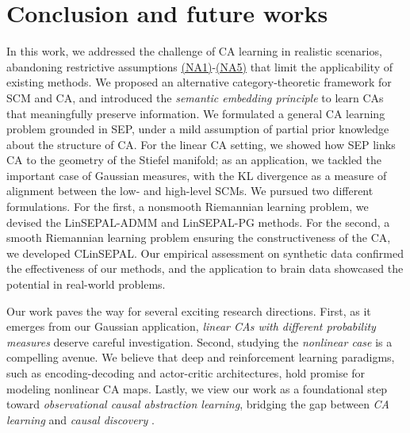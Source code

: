 \section{Conclusion and future works}\label{sec:concl_and_fw}
In this work, we addressed the challenge of CA learning in realistic scenarios, abandoning restrictive assumptions \hyperlink{(NA1)}{(NA1)}-\hyperlink{(NA5)}{(NA5)} that limit the applicability of existing methods. We proposed an alternative category-theoretic framework for SCM and CA, and introduced the \emph{semantic embedding principle} to learn CAs that meaningfully preserve information. We formulated a general CA learning problem grounded in SEP, under a mild assumption of partial prior knowledge about the structure of CA. 
For the linear CA setting, we showed how SEP links CA to the geometry of the Stiefel manifold; as an application, we tackled the important case of Gaussian measures, with the KL divergence as a measure of alignment between the low- and high-level SCMs. We pursued two different formulations.
For the first, a nonsmooth Riemannian learning problem, we devised the LinSEPAL-ADMM and LinSEPAL-PG methods. 
For the second, a smooth Riemannian learning problem ensuring the constructiveness of the CA, we developed CLinSEPAL.
Our empirical assessment on synthetic data confirmed the effectiveness of our methods, and the application to brain data showcased the potential in real-world problems.

Our work paves the way for several exciting research directions.
First, as it emerges from our Gaussian application, \emph{linear CAs with different probability measures} deserve careful investigation.
Second, studying the \emph{nonlinear case} is a compelling avenue. 
We believe that deep and reinforcement learning paradigms, such as encoding-decoding and actor-critic architectures, hold promise for modeling nonlinear CA maps.
Lastly, we view our work as a foundational step toward \emph{observational causal abstraction learning}, bridging the gap between \emph{CA learning} and \emph{causal discovery} \cite{spirtes2016causal}. 